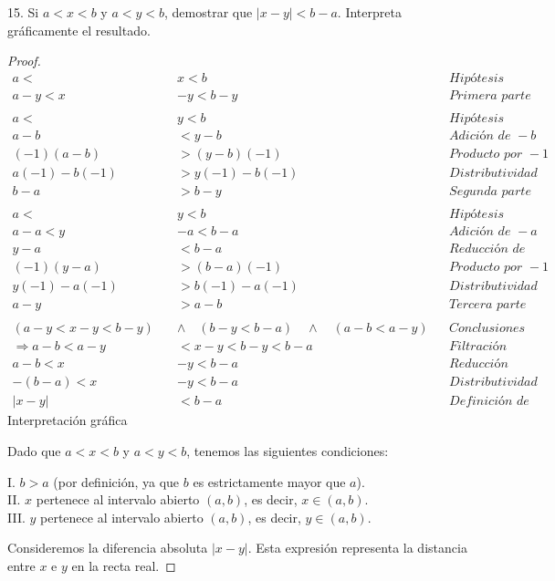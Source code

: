 \documentclass{article}
\begin{document}
15. Si \(a<x<b\) y \(a<y<b\), demostrar que \(|x-y|<b-a\). Interpreta gráficamente el resultado.\\
\begin{proof}
\begin{align*}
a<&x<b && \textit{Hipótesis}   \\
a - y < x &- y < b - y &&\textit{Primera parte terminada} \\
&\\
a < &y < b && \textit{Hipótesis} \\
a - b &< y - b && \textit{Adición de }-b \\
(-1)(a-b) &> (y-b)(-1) && \textit{Producto por }-1\\
a(-1) - b(-1) &> y(-1) - b(-1) && \textit{Distributividad}\\
b - a &> b - y && \textit{Segunda parte terminada} \\
&\\
a < &y < b && \textit{Hipótesis}\\
a - a < y&-a < b - a && \textit{Adición de }-a\\
y - a &< b - a && \textit{Reducción de la inecuación}\\
(-1)(y-a) &> (b-a)(-1) && \textit{Producto por }-1\\
y(-1) - a(-1) &> b(-1) - a(-1) && \textit{Distributividad}\\
a - y &> a - b && \textit{Tercera parte terminada}\\
&\\
(a - y < x - y < b - y) \quad &\land \quad (b - y < b - a)  \quad \land \quad  (a - b < a - y) && \textit{Conclusiones} \\
\Rightarrow a - b < a - y &< x - y < b - y < b - a && \textit{Filtración} \\
a - b < x &- y < b - a && \textit{Reducción} \\
-(b-a) < x &- y < b - a && \textit{Distributividad del negativo} \\
|x - y| &< b - a && \textit{Definición de valor absoluto}
\end{align*}
Interpretación gráfica

Dado que \(a < x < b\) y \(a < y < b\), tenemos las siguientes condiciones:
\begin{mdframed}
I. \(b > a\) (por definición, ya que \(b\) es estrictamente mayor que \(a\)). \\
II. \(x\) pertenece al intervalo abierto \((a, b)\), es decir, \(x \in (a, b)\). \\
III. \(y\) pertenece al intervalo abierto \((a, b)\), es decir, \(y \in (a, b)\).
\end{mdframed}
Consideremos la diferencia absoluta \(|x - y|\). Esta expresión representa la distancia entre \(x\) e \(y\) en la recta real.


\end{proof}
\end{document}
